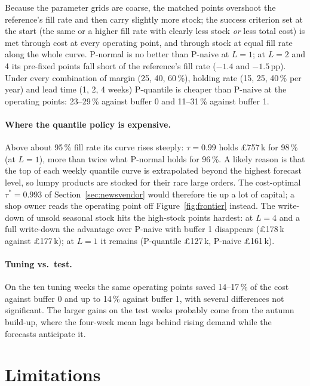 \documentclass[11pt,a4paper]{article}
\begin{document}
Because the parameter grids are coarse, the matched points overshoot the reference's fill rate
and then carry slightly more stock; the success criterion set at the start (the same or a higher fill rate with
clearly less stock \emph{or} less total cost) is met through cost at every operating point,
and through stock at equal fill rate along the whole curve. P-normal is no better than P-naive
at $L = 1$; at $L = 2$ and 4 its pre-fixed points fall short of the reference's fill rate
($-1.4$ and $-1.5$\,pp). Under every combination of margin (25, 40, 60\,\%), holding rate (15,
25, 40\,\% per year) and lead time (1, 2, 4 weeks) P-quantile is cheaper than P-naive at the
operating points: 23--29\,\% against buffer 0 and 11--31\,\% against buffer 1.

\paragraph{Where the quantile policy is expensive.} Above about 95\,\% fill rate its curve
rises steeply: $\tau = 0.99$ holds £757\,k for 98\,\% (at $L = 1$), more than twice what P-normal
holds for 96\,\%. A likely reason is that the top of each weekly quantile curve is extrapolated
beyond the highest forecast level, so lumpy products are stocked for their rare large orders. The cost-optimal $\tau^* = 0.993$ of
Section~\ref{sec:newsvendor} would therefore tie up a lot of capital; a shop owner reads the
operating point off Figure~\ref{fig:frontier} instead. The write-down of unsold seasonal stock
hits the high-stock points hardest: at $L = 4$ and a full write-down the advantage over P-naive
with buffer 1 disappears (£178\,k against £177\,k); at $L = 1$ it remains (P-quantile
£127\,k, P-naive £161\,k).

\paragraph{Tuning vs.\ test.} On the ten tuning weeks the same operating points saved 14--17\,\%
of the cost against buffer 0 and up to 14\,\% against buffer 1, with several differences not
significant. The larger gains on the test weeks probably come from the autumn build-up, where
the four-week mean lags behind rising demand while the forecasts anticipate it.

\section{Limitations}
\label{sec:limitations}
\end{document}
